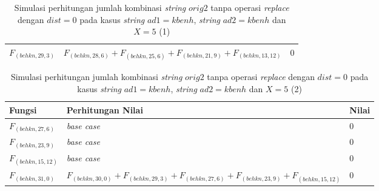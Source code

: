 \begin{appendices}
\begin{table}[H]
\begin{tabular} {|p{3cm}|p{5cm}|p{1cm}|}
  		$ F_{(behkn, 29, 3)}  $ & $F_{(behkn, 28, 6)} + F_{(behkn, 25, 6)} + F_{(behkn, 21, 9)} + F_{(behkn, 13, 12)}$ & $ 0 $ \\ \hline
  	\end{tabular}\caption{Simulasi perhitungan jumlah kombinasi \textit{string} $ orig2 $ tanpa operasi \textit{replace} dengan $ dist= 0  $ pada kasus \textit{string} $ ad1=kbenh $, \textit{string} $ ad2=kbenh $ dan $ X=5 $ (1)}
  	\label{tab:f_3_orig2_0_1}
  \end{table}
  \begin{table}[H]
  	\centering
  	\begin{tabular} {|p{3cm}|p{5cm}|p{1cm}|} \hline
  		Fungsi & Perhitungan Nilai & Nilai \\ \hline		
  		
  		$ F_{(behkn, 27, 6)} $ & \textit{base case} & $ 0 $ \\ \hline
  		$ F_{(behkn, 23, 9)} $ & \textit{base case} & $ 0 $ \\ \hline
  		$ F_{(behkn, 15, 12)} $ & \textit{base case} & $ 0 $ \\ \hline
  		\rowcolor{LightCyan}
  		$ F_{(behkn, 31, 0)}  $ & $F_{(behkn, 30, 0)} + F_{(behkn, 29, 3)} + F_{(behkn, 27, 6)} + F_{(behkn, 23, 9)} + F_{(behkn, 15, 12)}$ & $ 0 $ \\ \hline
  	\end{tabular}\caption{Simulasi perhitungan jumlah kombinasi \textit{string} $ orig2 $ tanpa operasi \textit{replace} dengan $ dist= 0  $ pada kasus \textit{string} $ ad1=kbenh $, \textit{string} $ ad2=kbenh $ dan $ X=5 $ (2)}
  	\label{tab:f_3_orig2_0_2}
  \end{table}
  

\end{appendices}
